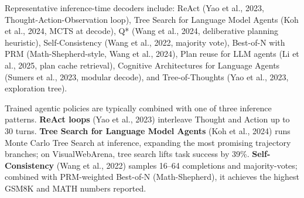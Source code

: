 Representative inference-time decoders include: ReAct (Yao et al., 2023, Thought-Action-Observation loop), Tree Search for Language Model Agents (Koh et al., 2024, MCTS at decode), Q* (Wang et al., 2024, deliberative planning heuristic), Self-Consistency (Wang et al., 2022, majority vote), Best-of-N with PRM (Math-Shepherd-style, Wang et al., 2024), Plan reuse for LLM agents (Li et al., 2025, plan cache retrieval), Cognitive Architectures for Language Agents (Sumers et al., 2023, modular decode), and Tree-of-Thoughts (Yao et al., 2023, exploration tree).

Trained agentic policies are typically combined with one of three inference patterns. \textbf{ReAct loops} (Yao et al., 2023) interleave Thought and Action up to 30 turns. \textbf{Tree Search for Language Model Agents} (Koh et al., 2024) runs Monte Carlo Tree Search at inference, expanding the most promising trajectory branches; on VisualWebArena, tree search lifts task success by 39\%. \textbf{Self-Consistency} (Wang et al., 2022) samples 16--64 completions and majority-votes; combined with PRM-weighted Best-of-N (Math-Shepherd), it achieves the highest GSM8K and MATH numbers reported.

